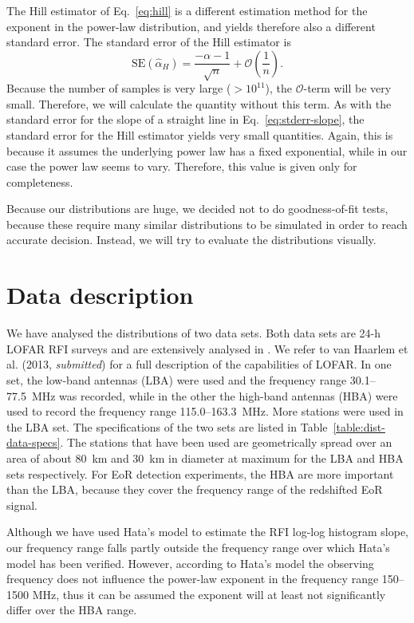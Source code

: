 \documentclass[useAMS,usenatbib]{mn2e}
\begin{document}
The Hill estimator of Eq.~\eqref{eq:hill} is a different estimation method for the exponent in the power-law distribution, and yields therefore also a different standard error. The standard error of the Hill estimator is \citep{power-law-distribution}
\begin{equation} \label{eq:stderr-hill}
 \textrm{SE}(\hat \alpha_H) = \frac{-\alpha - 1}{\sqrt{n}} + \mathcal{O}(\frac{1}{n}).
\end{equation}
Because the number of samples is very large ($>10^{11}$), the $\mathcal{O}$-term will be very small. Therefore, we will calculate the quantity without this term. As with the standard error for the slope of a straight line in Eq.~\eqref{eq:stderr-slope}, the standard error for the Hill estimator yields very small quantities. Again, this is because it assumes the underlying power law has a fixed exponential, while in our case the power law seems to vary. Therefore, this value is given only for completeness.

Because our distributions are huge, we decided not to do goodness-of-fit tests, because these require many similar distributions to be simulated in order to reach accurate decision. Instead, we will try to evaluate the distributions visually.

\section{Data description} \label{sec:dist-data}
We have analysed the distributions of two data sets. Both data sets are 24-h LOFAR RFI surveys and are extensively analysed in
\citet{lofar-radio-environment}. We refer to van Haarlem et al. (2013, \textit{submitted}) for a full description of the capabilities of LOFAR.
In one set, the low-band antennas (LBA) were used and the frequency range 30.1--77.5~MHz was recorded, while in the other the high-band antennas (HBA) were used to record the frequency range 115.0--163.3~MHz. More stations were used in the LBA set. The specifications of the two sets are listed in Table~\ref{table:dist-data-specs}. The stations that have been used are geometrically spread over an area of about 80~km and 30~km in diameter at maximum for the LBA and HBA sets respectively. For EoR detection experiments, the HBA are more important than the LBA, because they cover the frequency range of the redshifted EoR signal.

Although we have used Hata's model to estimate the RFI log-log histogram slope, our frequency range falls partly outside the frequency range over which Hata's model has been verified. However, according to Hata's model the observing frequency does not influence the power-law exponent in the frequency range 150--1500 MHz, thus it can be assumed the exponent will at least not significantly differ over the HBA range.
\end{document}
